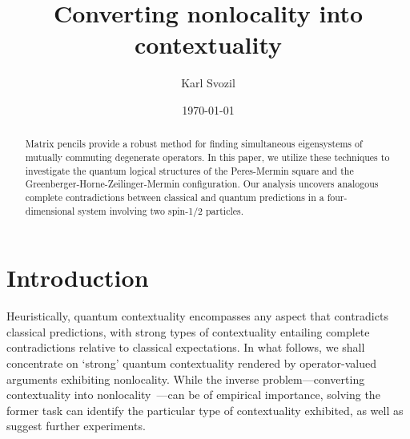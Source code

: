 \documentclass[
  twocolumn,
 showpacs,
 showkeys,
 preprintnumbers,
 amsmath,amssymb,
 aps,
 pra,
  longbibliography,
 floatfix,
 ]{revtex4-2}
\begin{document}
\title{Converting nonlocality into contextuality}



\author{Karl Svozil}




\date{\today}

\begin{abstract}
Matrix pencils provide a robust method for finding simultaneous eigensystems of mutually commuting degenerate operators. In this paper, we utilize these techniques to investigate the quantum logical structures of the Peres-Mermin square and the Greenberger-Horne-Zeilinger-Mermin configuration. Our analysis uncovers analogous complete contradictions between classical and quantum predictions in a four-dimensional system involving two spin-1/2 particles.
\end{abstract}


\maketitle




\section{Introduction}


Heuristically, quantum contextuality encompasses any aspect that contradicts classical predictions, with strong types of contextuality entailing complete contradictions relative to classical expectations. In what follows, we shall concentrate on `strong' quantum contextuality rendered by operator-valued arguments exhibiting nonlocality. While the inverse problem---converting contextuality into nonlocality~\cite{cabello2020converting}---can be of empirical importance, solving the former task can identify the particular type of contextuality exhibited, as well as suggest further experiments.
\end{document}
